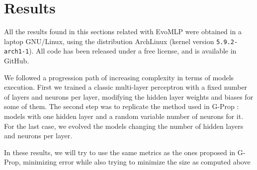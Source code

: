 \documentclass[conference]{IEEEtran}\usepackage[]{graphicx}\usepackage[]{color}
\begin{document}
\section{Results}
\label{sec:res}


All the results found in this sections related with {\sf EvoMLP}
\cite{deep-g-prop:anon} were obtained in a laptop GNU/Linux, using the
distribution ArchLinux (kernel version \texttt{5.9.2-arch1-1}). All code has been released under a free license, and is available in GitHub.

% 

We followed a progression path of increasing complexity in terms of models
execution. First we trained a classic multi-layer perceptron with a fixed number
of layers and neurons per layer, modifying the hidden layer weights and biases
for some of them. The second step was to replicate the method used in G-Prop
\cite{castilloNC,CastilloNPL}: models with one hidden layer and a random
variable number of neurons for it. For the last case, we evolved the models
changing the number of hidden layers and neurons per layer.

In these results, we will try to use the same metrics as the ones
proposed in G-Prop, minimizing error while also trying to minimize the size as computed above
\end{document}
